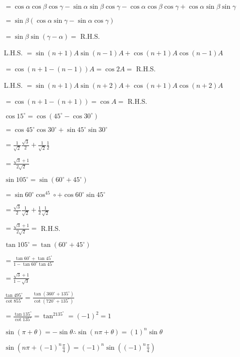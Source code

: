  $= \cos\alpha\cos\beta\cos\gamma - \sin\alpha\sin\beta\cos\gamma - \cos\alpha\cos\beta\cos\gamma +
  \cos\alpha\sin\beta\sin\gamma$

  $= \sin\beta(\cos\alpha\sin\gamma - \sin\alpha\cos\gamma)$

  $= \sin\beta\sin(\gamma - \alpha) =$ R.H.S.

\item L.H.S. $= \sin(n + 1)A\sin(n - 1)A + \cos(n + 1)A\cos(n - 1)A$

  $= \cos(n + 1 - (n - 1))A = \cos 2A =$ R.H.S.

\item L.H.S. $= \sin(n + 1)A\sin(n + 2)A + \cos(n + 1)A\cos(n + 2)A$

  $= \cos(n + 1 - (n + 1)) = \cos A =$ R.H.S.

\item $\cos 15^\circ = \cos(45^\circ - \cos 30^\circ)$

  $= \cos45^\circ\cos30^\circ + \sin45^\circ\sin30^\circ$

  $= \frac{1}{\sqrt{2}}\frac{\sqrt{3}}{2} + \frac{1}{\sqrt{2}}\frac{1}{2}$

  $= \frac{\sqrt{3} + 1}{2\sqrt{2}}$

  $\sin 105^\circ = \sin(60^\circ + 45^\circ)$

  $= \sin60^\circ\cos^45\circ + \cos60^\circ\sin45^\circ$

  $= \frac{\sqrt{3}}{2}\frac{1}{\sqrt{2}} + \frac{1}{2}\frac{1}{\sqrt{2}}$

  $= \frac{\sqrt{3} + 1}{2\sqrt{2}} =$ R.H.S.

\item $\tan 105^\circ = \tan(60^\circ + 45^\circ)$

  $= \frac{\tan60^\circ + \tan 45^\circ}{1 - \tan60^\circ\tan 45^\circ}$

  $= \frac{\sqrt{3} + 1}{1 - \sqrt{3}}$

\item $\frac{\tan 495^\circ}{\cot 855^\circ} = \frac{\tan(360^\circ + 135^\circ)}{\cot(720^\circ + 135^\circ)}$

  $= \frac{\tan 135^\circ}{\cot 135^\circ} = \tan^2135^\circ = (-1)^2 = 1$

\item $\sin(\pi + \theta) = -\sin\theta \therefore \sin(n\pi + \theta) = (1)^n\sin\theta$

  $\sin\left(n\pi + (-1)^n \frac{\pi}{4}\right) = (-1)^n\sin\left((-1)^n\frac{\pi}{4}\right)$

